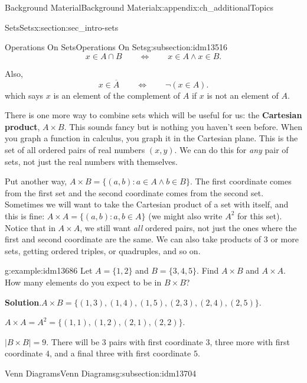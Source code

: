 \documentclass[oneside,10pt,]{book}
\newcommand{\terminology}[1]{\textbf{#1}}
\numberwithin{equation}{chapter}
\def\st{:}
\def\Iff{\Leftrightarrow}
\begin{document}
\begin{appendixptx}{Background Material}{}{Background Material}{}{}{x:appendix:ch_additionalTopics}
\begin{sectionptx}{Sets}{}{Sets}{}{}{x:section:sec_intro-sets}
\begin{subsectionptx}{Operations On Sets}{}{Operations On Sets}{}{}{g:subsection:idm13516}
\begin{equation*}
x \in A \cap B \qquad \Iff \qquad x \in A \wedge x \in B.
\end{equation*}
%
\par
Also,%
\begin{equation*}
x \in \overline A \qquad \Iff \qquad \neg (x \in A).
\end{equation*}
which says \(x\) is an element of the complement of \(A\) if \(x\) is not an element of \(A\).%
\par
There is one more way to combine sets which will be useful for us: the \terminology{Cartesian product}, \(A \times B\)\label{g:notation:idm13673}. This sounds fancy but is nothing you haven't seen before. When you graph a function in calculus, you graph it in the Cartesian plane. This is the set of all ordered pairs of real numbers \((x,y)\). We can do this for \emph{any} pair of sets, not just the real numbers with themselves.%
\par
Put another way, \(A \times B = \{(a,b) \st a \in A \wedge b \in B\}\). The first coordinate comes from the first set and the second coordinate comes from the second set. Sometimes we will want to take the Cartesian product of a set with itself, and this is fine: \(A \times A = \{(a,b) \st a, b \in A\}\) (we might also write \(A^2\) for this set). Notice that in \(A \times A\), we still want \emph{all} ordered pairs, not just the ones where the first and second coordinate are the same. We can also take products of 3 or more sets, getting ordered triples, or quadruples, and so on.%
\begin{example}{}{g:example:idm13686}%
Let \(A = \{1,2\}\) and \(B = \{3,4,5\}\). Find \(A \times B\) and \(A \times A\). How many elements do you expect to be in \(B \times B\)?%
\par\smallskip%
\noindent\textbf{Solution}.\hypertarget{g:solution:idm13694}{}\quad{}\(A \times B = \{(1,3), (1,4), (1,5), (2,3), (2,4), (2,5)\}\).%
\par
\(A \times A = A^2 = \{(1,1), (1,2), (2,1), (2,2)\}\).%
\par
\(|B\times B| = 9\). There will be 3 pairs with first coordinate \(3\), three more with first coordinate \(4\), and a final three with first coordinate \(5\).%
\end{example}
\end{subsectionptx}
%
%
\typeout{************************************************}
\typeout{************************************************}
%
\begin{subsectionptx}{Venn Diagrams}{}{Venn Diagrams}{}{}{g:subsection:idm13704}

\end{subsectionptx}
\end{sectionptx}
\end{appendixptx}
\end{document}
